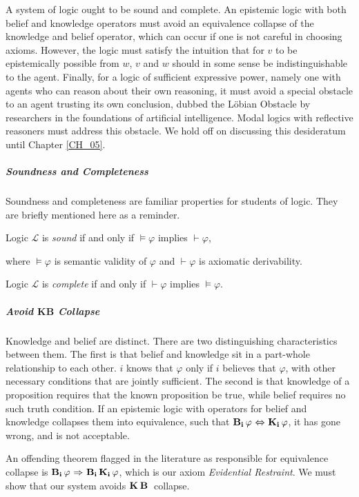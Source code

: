 A system of logic ought to be sound and complete. An epistemic logic with both belief and knowledge operators must avoid an equivalence collapse of the knowledge and belief operator, which can occur if one is not careful in choosing axioms. However, the logic must satisfy the intuition that for $v$ to be epistemically possible from $w$, $v$ and $w$ should in some sense be indistinguishable to the agent. Finally, for a logic of sufficient expressive power, namely one with agents who can reason about their own reasoning, it must avoid a special obstacle to an agent trusting its own conclusion, dubbed the L\"obian Obstacle by researchers in the foundations of artificial intelligence. Modal logics with reflective reasoners must address this obstacle. We hold off on discussing this desideratum until Chapter \ref{CH_05}.

\subparagraph{Soundness and Completeness}
Soundness and completeness are familiar properties for students of logic. They are briefly mentioned here as a reminder.
\begin{definition}[Soundness]
	Logic $\mathcal{L}$ is \emph{sound} if and only if $\models\varphi$ implies $\vdash\varphi$,
\end{definition}
where $\models\varphi$ is semantic validity of $\varphi$ and $\vdash\varphi$ is axiomatic derivability.

\begin{definition}[Completeness]
	Logic $\mathcal{L}$ is \emph{complete} if and only if $\vdash\varphi$ implies $\models\varphi$.
\end{definition}

\subparagraph{Avoid $\mathbf{KB}$ Collapse}
Knowledge and belief are distinct. There are two distinguishing characteristics between them. The first is that belief and knowledge sit in a part-whole relationship to each other. $i$ knows that $\varphi$ only if $i$ believes that $\varphi$, with other necessary conditions that are jointly sufficient. The second is that knowledge of a proposition requires that the known proposition be true, while belief requires no such truth condition. If an epistemic logic with operators for belief and knowledge collapses them into equivalence, such that $\mathbf{B}_{\mathbf{i}}\,\varphi {\ \Leftrightarrow \ } \mathbf{K}_{\mathbf{i}}\,\varphi$, it has gone wrong, and is not acceptable.

An offending theorem flagged in the literature as responsible for equivalence collapse is $\mathbf{B}_{\mathbf{i}}\,\varphi {\ \Rightarrow \ } \mathbf{B}_{\mathbf{i}}\,\mathbf{K}_{\mathbf{i}}\,\varphi$, which is our axiom \emph{Evidential Restraint}. We must show that our system avoids $\mathbf{K}_{\mathbf{}}\,\mathbf{B}_{\mathbf{}}\,$ collapse.

